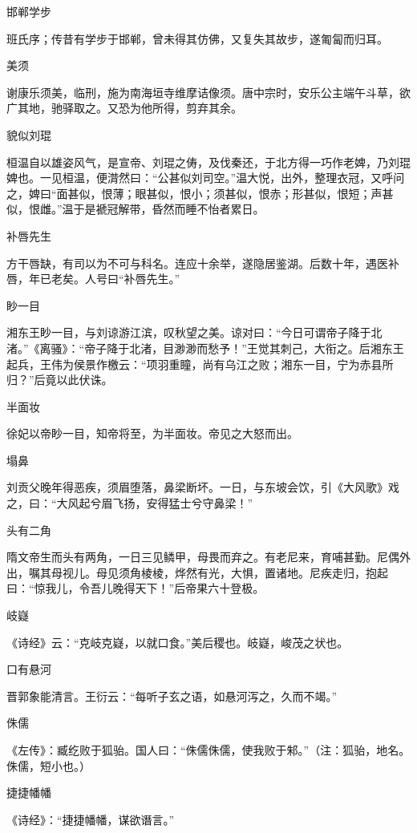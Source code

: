 \documentclass[a4paper,12pt,UTF8,twoside]{ctexbook}
\begin{document}
    邯郸学步
    
    班氏序；传昔有学步于邯郸，曾未得其仿佛，又复失其故步，遂匍匐而归耳。
    
    美须
    
    谢康乐须美，临刑，施为南海垣寺维摩诘像须。唐中宗时，安乐公主端午斗草，欲广其地，驰驿取之。又恐为他所得，剪弃其余。
    
    貌似刘琨
    
    桓温自以雄姿风气，是宣帝、刘琨之俦，及伐秦还，于北方得一巧作老婢，乃刘琨婢也。一见桓温，便潸然曰：“公甚似刘司空。”温大悦，出外，整理衣冠，又呼问之，婢曰“面甚似，恨薄；眼甚似，恨小；须甚似，恨赤；形甚似，恨短；声甚似，恨雌。”温于是褫冠解带，昏然而睡不怡者累日。
    
    补唇先生
    
    方干唇缺，有司以为不可与科名。连应十余举，遂隐居鉴湖。后数十年，遇医补唇，年已老矣。人号曰“补唇先生。”
    
    眇一目
    
    湘东王眇一目，与刘谅游江滨，叹秋望之美。谅对曰：“今日可谓帝子降于北渚。”《离骚》：“帝子降于北渚，目渺渺而愁予！”王觉其刺己，大衔之。后湘东王起兵，王伟为侯景作檄云：“项羽重瞳，尚有乌江之败；湘东一目，宁为赤县所归？”后竟以此伏诛。
    
    半面妆
    
    徐妃以帝眇一目，知帝将至，为半面妆。帝见之大怒而出。
    
    塌鼻
    
    刘贡父晚年得恶疾，须眉堕落，鼻梁断坏。一日，与东坡会饮，引《大风歌》戏之，曰：“大风起兮眉飞扬，安得猛士兮守鼻梁！”
    
    头有二角
    
    隋文帝生而头有两角，一日三见鳞甲，母畏而弃之。有老尼来，育哺甚勤。尼偶外出，嘱其母视儿。母见须角棱棱，烨然有光，大惧，置诸地。尼疾走归，抱起曰：“惊我儿，令吾儿晚得天下！”后帝果六十登极。
    
    岐嶷
    
    《诗经》云：“克岐克嶷，以就口食。”美后稷也。岐嶷，峻茂之状也。
    
    口有悬河
    
    晋郭象能清言。王衍云：“每听子玄之语，如悬河泻之，久而不竭。”
    
    侏儒
    
    《左传》：臧纥败于狐骀。国人曰：“侏儒侏儒，使我败于邾。”（注：狐骀，地名。侏儒，短小也。）
    
    捷捷幡幡
    
    《诗经》：“捷捷幡幡，谋欲谮言。”
    
\end{document}
